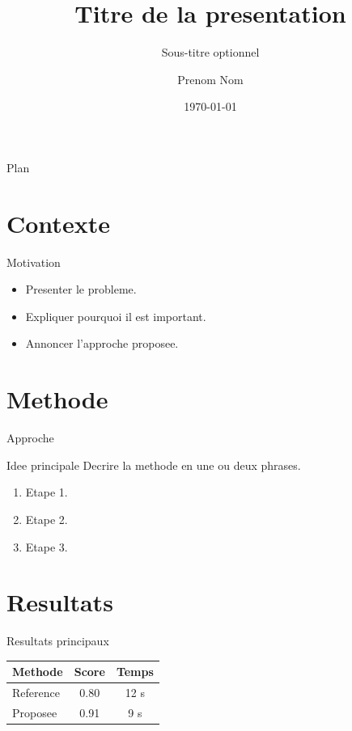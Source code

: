 \documentclass[aspectratio=169]{beamer}
\title[Titre court]{Titre de la presentation}
\subtitle{Sous-titre optionnel}
\author{Prenom Nom}
\institute{Institution}
\date{\today}
\begin{document}
\begin{frame}
  \titlepage
\end{frame}

\begin{frame}{Plan}
  \tableofcontents
\end{frame}

\section{Contexte}

\begin{frame}{Motivation}
  \begin{itemize}
    \item Presenter le probleme.
    \item Expliquer pourquoi il est important.
    \item Annoncer l'approche proposee.
  \end{itemize}
\end{frame}

\section{Methode}

\begin{frame}{Approche}
  \begin{block}{Idee principale}
    Decrire la methode en une ou deux phrases.
  \end{block}

  \begin{enumerate}
    \item Etape 1.
    \item Etape 2.
    \item Etape 3.
  \end{enumerate}
\end{frame}

\section{Resultats}

\begin{frame}{Resultats principaux}
  \begin{table}
    \centering
    \begin{tabular}{lcc}
      \toprule
      Methode & Score & Temps \\
      \midrule
      Reference & 0.80 & 12 s \\
      Proposee & 0.91 & 9 s \\
      \bottomrule
    \end{tabular}
  \end{table}
\end{frame}
\end{document}
